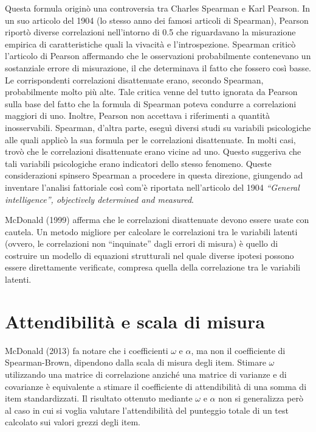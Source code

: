 \documentclass[
  11pt,
]{krantz}
\theoremstyle{definition}
\theoremstyle{definition}
\theoremstyle{definition}
\theoremstyle{definition}
\theoremstyle{remark}
\begin{document}
Questa formula originò una controversia tra Charles Spearman e Karl Pearson. In un suo articolo del 1904 (lo stesso anno dei famosi articoli di Spearman), Pearson riportò diverse correlazioni nell'intorno di 0.5 che riguardavano la misurazione empirica di caratteristiche quali la vivacità e l'introspezione. Spearman criticò l'articolo di Pearson affermando che le osservazioni probabilmente contenevano un sostanziale errore di misurazione, il che determinava il fatto che fossero così basse. Le corrispondenti correlazioni disattenuate erano, secondo Spearman, probabilmente molto più alte. Tale critica venne del tutto ignorata da Pearson sulla base del fatto che la formula di Spearman poteva condurre a correlazioni maggiori di uno. Inoltre, Pearson non accettava i riferimenti a quantità inosservabili. Spearman, d'altra parte, eseguì diversi studi su variabili psicologiche alle quali applicò la sua formula per le correlazioni disattenuate. In molti casi, trovò che le correlazioni disattenuate erano vicine ad uno. Questo suggeriva che tali variabili psicologiche erano indicatori dello stesso fenomeno. Queste considerazioni spinsero Spearman a procedere in questa direzione, giungendo ad inventare l'analisi fattoriale così com'è riportata nell'articolo del 1904 \emph{``General intelligence'', objectively determined and measured}.

McDonald (1999) afferma che le correlazioni disattenuate devono essere usate con cautela. Un metodo migliore per calcolare le correlazioni tra le variabili latenti (ovvero, le correlazioni non ``inquinate'' dagli errori di misura) è quello di costruire un modello di equazioni strutturali nel quale diverse ipotesi possono essere direttamente verificate, compresa quella della correlazione tra le variabili latenti.

\hypertarget{attendibilituxe0-e-scala-di-misura}{%
\section{Attendibilità e scala di misura}\label{attendibilituxe0-e-scala-di-misura}}

McDonald (2013) fa notare che i coefficienti \(\omega\) e \(\alpha\), ma non il coefficiente di Spearman-Brown, dipendono dalla scala di misura degli item. Stimare \(\omega\) utilizzando una matrice di correlazione anziché una matrice di varianze e di covarianze è equivalente a stimare il coefficiente di attendibilità di una somma di item standardizzati. Il risultato ottenuto mediante \(\omega\) e \(\alpha\) non si generalizza però al caso in cui si voglia valutare l'attendibilità del punteggio totale di un test calcolato sui valori grezzi degli item.
\end{document}

